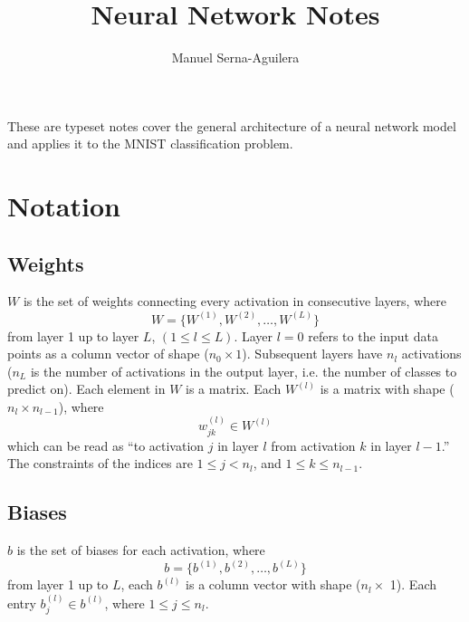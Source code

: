 \documentclass[12pt]{article}
\title{Neural Network Notes}
\author{Manuel Serna-Aguilera}
\date{}
\begin{document}
\maketitle

\noindent
These are typeset notes cover the general architecture of a neural network model and applies it to the MNIST classification problem.

\section*{Notation}
\subsection*{Weights}
$W$ is the set of weights connecting every activation in consecutive layers, where
\begin{equation*}
    W=\{W^{(1)}, W^{(2)}, \ldots, W^{(L)}\}
\end{equation*}
from layer 1 up to layer $L$, $(1 \leq l \leq L)$. Layer $l=0$ refers to the input data points as a column vector of shape ($n_0 \times 1$). Subsequent layers have $n_l$ activations ($n_L$ is the number of activations in the output layer, i.e. the number of classes to predict on). Each element in $W$ is a matrix. Each $W^{(l)}$ is a matrix with shape ($n_l \times n_{l-1}$), where
\begin{equation*}
    w_{jk}^{(l)} \in W^{(l)}
\end{equation*}
which can be read as ``to activation $j$ in layer $l$ from activation $k$ in layer $l-1$.'' The constraints of the indices are $1 \leq j <  n_l$, and $1 \leq k \leq n_{l-1}$. 

\subsection*{Biases}
$b$ is the set of biases for each activation, where
\begin{equation*}
    b = \{b^{(1)}, b^{(2)}, \ldots, b^{(L)}\}
\end{equation*}
from layer 1 up to $L$, each $b^{(l)}$ is a column vector with shape ($n_l \times$ 1). Each entry $b_j^{(l)} \in b^{(l)}$, where $1 \leq j \leq n_l$.

\newpage

\end{document}
